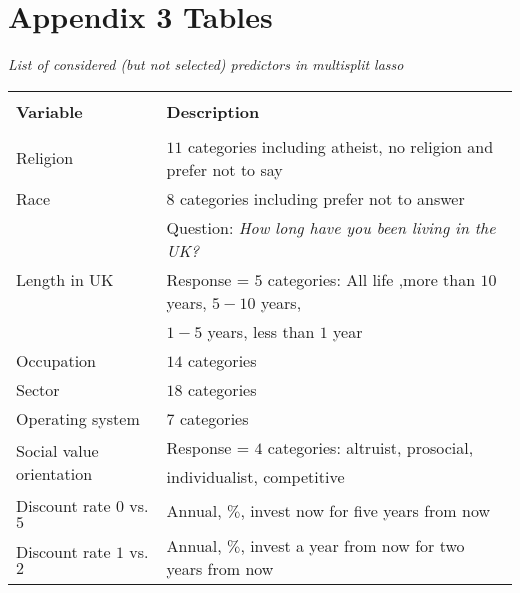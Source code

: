 \documentclass[a4paper,12pt]{article}
\begin{document}
\section{Appendix 3 Tables}

{\centering
\begin{threeparttable}
\caption{\textit{\vspace{-0.3cm}List of considered (but not selected) predictors in multisplit lasso}}
\label{PotentialPredictors} 
\centering
\begin{small}
\begin{tabular}{ll} 
\hline \vspace{-0.25cm} \\	
  \multicolumn{1}{l}{\vspace{0.1cm}\textbf{Variable}}&   \multicolumn{1}{l}{\textbf{Description}}   \\ 
\hline \vspace{-0.3cm} \\ 
\vspace{0.15cm}Religion& $11$ categories including atheist, no religion and prefer not to say\\
\vspace{0.15cm}Race& $8$ categories including prefer not to answer\\
\multirow{3}{*}{Length in UK}&Question: \textit{How long have you been living in the UK?}\\
&Response = $5$ categories: All life ,more than $10$ years, $5-10$ years,\\
\vspace{0.15cm}& $1-5$ years, less than $1$ year\\
\vspace{0.15cm}Occupation&$14$ categories\\
\vspace{0.15cm}Sector&$18$ categories\\
\vspace{0.15cm}Operating system&$7$ categories\\
\multirow{2}{*}{Social value orientation}&Response = $4$ categories: altruist, prosocial,\\
\vspace{0.15cm}& individualist, competitive\\
\vspace{0.15cm}Discount rate $0$ vs. $5$&Annual, $\%$, invest now for five years from now \\
\vspace{0.15cm}Discount rate $1$ vs. $2$&Annual, $\%$, invest a year from now for two years from now \\

\end{tabular}
\end{small}
\end{threeparttable}}
\end{document}
